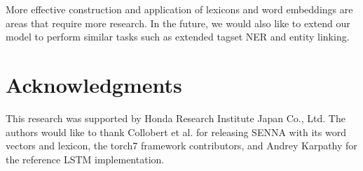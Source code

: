 \documentclass[11pt,letterpaper]{article}
\begin{document}
More effective construction and application of lexicons and word embeddings are areas that require more research. In the future, we would also like to extend our model to perform similar tasks such as extended tagset NER and entity linking.


\section*{Acknowledgments}

This research was supported by Honda Research Institute Japan Co., Ltd. The authors would like to thank Collobert et al.  for releasing SENNA with its word vectors and lexicon, the torch7 framework contributors, and Andrey Karpathy for the reference LSTM implementation.




\end{document}
